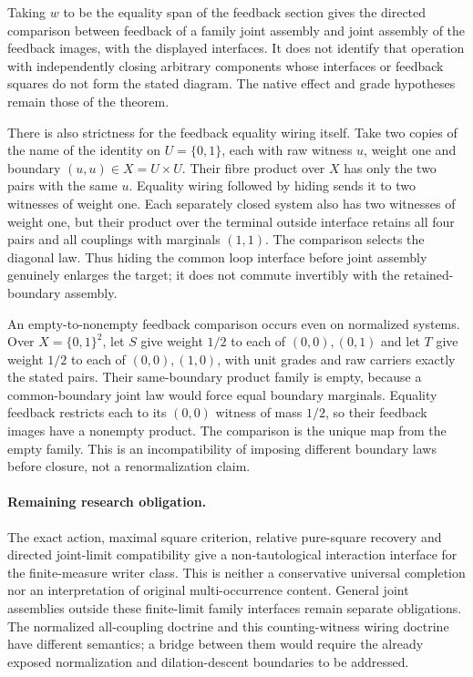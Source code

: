 \documentclass{article}
\begin{document}
Taking $w$ to be the equality span of the feedback section gives the directed comparison between feedback of a family joint assembly and joint assembly of the feedback images, with the displayed interfaces. It does not identify that operation with independently closing arbitrary components whose interfaces or feedback squares do not form the stated diagram. The native effect and grade hypotheses remain those of the theorem.

There is also strictness for the feedback equality wiring itself. Take two copies of the name of the identity on $U=\{0,1\}$, each with raw witness $u$, weight one and boundary $(u,u)\in X=U\times U$. Their fibre product over $X$ has only the two pairs with the same $u$. Equality wiring followed by hiding sends it to two witnesses of weight one. Each separately closed system also has two witnesses of weight one, but their product over the terminal outside interface retains all four pairs and all couplings with marginals $(1,1)$. The comparison selects the diagonal law. Thus hiding the common loop interface before joint assembly genuinely enlarges the target; it does not commute invertibly with the retained-boundary assembly.

An empty-to-nonempty feedback comparison occurs even on normalized systems. Over $X=\{0,1\}^2$, let $S$ give weight $1/2$ to each of $(0,0),(0,1)$ and let $T$ give weight $1/2$ to each of $(0,0),(1,0)$, with unit grades and raw carriers exactly the stated pairs. Their same-boundary product family is empty, because a common-boundary joint law would force equal boundary marginals. Equality feedback restricts each to its $(0,0)$ witness of mass $1/2$, so their feedback images have a nonempty product. The comparison is the unique map from the empty family. This is an incompatibility of imposing different boundary laws before closure, not a renormalization claim.

\paragraph{Remaining research obligation.}
The exact action, maximal square criterion, relative pure-square recovery and directed joint-limit compatibility give a non-tautological interaction interface for the finite-measure writer class. This is neither a conservative universal completion nor an interpretation of original multi-occurrence content. General joint assemblies outside these finite-limit family interfaces remain separate obligations. The normalized all-coupling doctrine and this counting-witness wiring doctrine have different semantics; a bridge between them would require the already exposed normalization and dilation-descent boundaries to be addressed.
\end{document}
